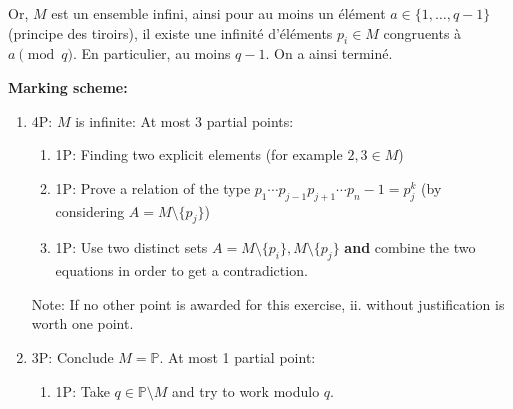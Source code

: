 {Or, $M$ est un ensemble infini, ainsi pour au moins un élément $a\in \{1,\ldots,q-1\}$ (principe des tiroirs), il existe une infinité d'éléments $p_i\in M$ congruents à $a\pmod q$. En particulier, au moins $q-1$. On a ainsi terminé.

\textbf{Marking scheme:}
\begin{enumerate}
    \item 4P: $M$ is infinite: At most 3 partial points:
    \begin{enumerate}
        \item 1P: Finding two explicit elements (for example $2,3\in M$) 
        \item 1P: Prove a relation of the type $p_1\cdots p_{j-1}p_{j+1}\cdots p_n-1 = p_j^k$ (by considering $A=M\setminus \{p_j\}$)
        \item 1P: Use two distinct sets $A=M\setminus \{p_i\}, M\setminus \{p_j\}$  \textbf{and} combine the two equations in order to get a contradiction.
        
    \end{enumerate}
    Note: If no other point is awarded for this exercise, ii. without justification is worth one point.
    \item 3P: Conclude $M=\mathbb P$. At most 1 partial point:
    \begin{enumerate}
        \item 1P: Take $q\in \mathbb{P}\setminus M$ and try to work modulo $q$.
    \end{enumerate}
\end{enumerate}

}